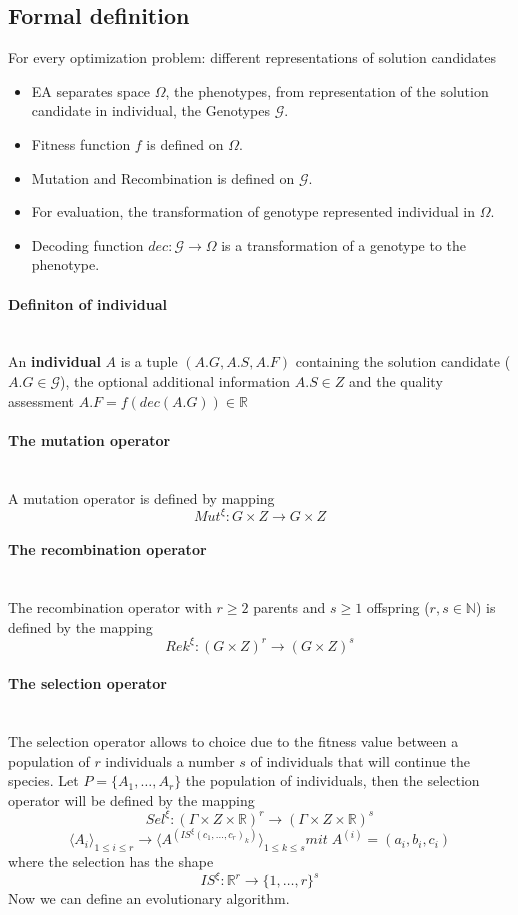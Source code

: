 \documentclass{article}
\begin{document}
\subsection{Formal definition}
For every optimization problem: different representations of solution candidates
\begin{itemize}
    \item EA separates space $\Omega$, the phenotypes, from representation of the solution
          candidate in individual, the Genotypes $\mathcal{G}$.
    \item Fitness function $f$ is defined on $\Omega$.
    \item Mutation and Recombination is defined on $\mathcal{G}$.
    \item For evaluation, the transformation of genotype represented individual in $\Omega$.
    \item Decoding function $dec:\mathcal{G}\rightarrow\Omega$ is a transformation of
          a genotype to the phenotype.
\end{itemize}

\paragraph{Definiton of individual}\mbox{}\\
An \textbf{individual} $A$ is a tuple $(A.G, A.S,A.F)$ containing
the solution candidate ($A.G\in\mathcal{G}$), the optional additional information $A.S\in Z$
and the quality assessment $A.F=f(dec(A.G))\in\mathbb{R}$

\paragraph{The mutation operator}\mbox{}\\
A mutation operator is defined by mapping
$$Mut^\xi:G\times Z\rightarrow G\times Z$$

\paragraph{The recombination operator}\mbox{}\\
The recombination operator with $r\geq 2$ parents
and $s\geq 1$ offspring ($r,s\in\mathbb{N}$) is defined by the mapping
$$Rek^\xi:(G\times Z)^r\rightarrow(G\times Z)^s$$

\paragraph{The selection operator}\mbox{}\\
The selection operator allows to choice due to the fitness value between a population of $r$
individuals a number $s$ of individuals that will continue the species. Let
$P=\{A_1,\dots,A_r\}$ the population of individuals, then the selection operator will
be defined by the mapping
$$Sel^\xi:(\Gamma\times Z\times\mathbb{R})^r\rightarrow(\Gamma\times Z\times\mathbb{R})^s$$
$$\langle A_i\rangle_{1\leq i\leq r}\rightarrow\langle A^{(IS^\xi (c_1,\dots,c_r)_k)}\rangle_{1\leq k\leq s}mit\;A^{(i)}=(a_i,b_i,c_i)$$
where the selection has the shape
$$IS^\xi:\mathbb{R}^r\rightarrow \{1,\dots,r\}^s$$
Now we can define an evolutionary algorithm.
\end{document}
